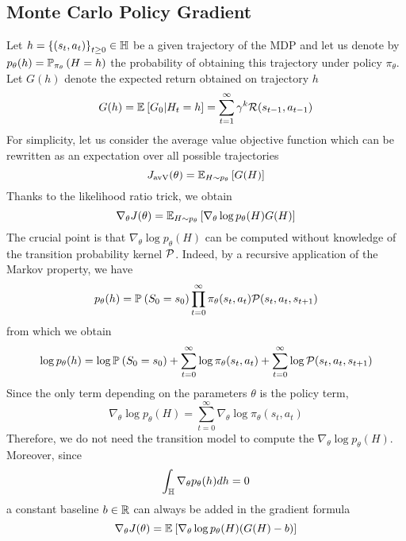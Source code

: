 \subsection{Monte Carlo Policy Gradient}
Let $h = {\{(s_t, a_t)\}}_{t\geq 0} \in \H$ be a given trajectory of the MDP and let us 
denote by $p_\theta(h) = \P[\pi_\theta]{H = h}$ the probability of obtaining 
this trajectory under policy $\pi_\theta$. Let $G(h)$ denote the expected return obtained on trajectory $h$
\begin{equation}
	G(h) = \E{G_0 | H_t = h} = \sum_{t=1}^\infty \gamma^k \calR(s_{t-1},
	a_{t-1}) 
\end{equation}
For simplicity, let us consider the average value objective function which can
be rewritten as an expectation over all possible trajectories
\begin{equation}
	J_{\text{avV}}(\theta) = \E[H \sim p_\theta]{G(H)}
\end{equation}
Thanks to the likelihood ratio trick, we obtain
\begin{equation}
		\nabla_\theta J(\theta) = \E[H\sim p_\theta]{\nabla_\theta \log p_\theta(H)G(H)}
\end{equation}
The crucial point is that $\nabla_\theta \log p_\theta(H)$ can be computed without
knowledge of the transition probability kernel $\calP$. Indeed, by a recursive application of the Markov property, we have
\begin{equation*}
	p_\theta(h) = \P{S_0 = s_0} \prod_{t=0}^\infty \pi_\theta(s_t, a_t)
	\calP(s_t, a_t, s_{t+1})
\end{equation*}
from which we obtain
\begin{equation*}
	\log p_\theta(h) = \log \P{S_0 = s_0} + \sum_{t=0}^\infty \log 
	\pi_\theta(s_t, a_t) + \sum_{t=0}^\infty \log \calP(s_t, a_t, s_{t+1})
\end{equation*}
Since the only term depending on the parameters $\theta$ is the policy term,
\begin{equation}
	\nabla_\theta \log p_\theta(H) = \sum_{t=0}^\infty \nabla_\theta \log 
	\pi_\theta(s_t, a_t)
\end{equation}
Therefore, we do not need the transition model to compute the $\nabla_\theta \log 
p_\theta(H)$. Moreover, since
\begin{equation*}
	\int_\H \nabla_\theta p_\theta(h) dh = 0	
\end{equation*}
a constant baseline $b \in \R$ can always be added in the gradient formula
\begin{equation}
	\nabla_\theta J(\theta) = \E{\nabla_\theta \log p_\theta(H)(G(H)-b)}
\end{equation}

